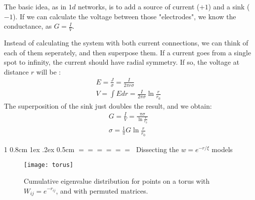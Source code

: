 \documentclass[onecolumn,fleqn,notitlepage,secnumarabic]{revtex4}
\makeatletter
\def\section{%
  \@startsection
    {section}%
    {1}%
    {\z@}%
    {0.8cm \@plus1ex \@minus .2ex}%
    {0.5cm}%
    {\Large\bf $=\!=\!=\!=\!=\!=\;$}%
}%
\makeatother
\begin{document}
The basic idea, as in $1d$ networks, is to add a source of current ($+1$) and a sink ($-1$). If we can calculate the voltage between those "electrodes", we know the conductance, as $G = \frac{I}{V}$. 

Instead of calculating the system with both current connections, we can think of each of them seperately, and then superpose them. If a current goes from a single spot to infinity, the current should have radial symmetry. If so, the voltage at distance $r$ will be :
\begin{align}
  E = \frac{J}{\sigma} = \frac{I}{2\pi r\sigma} \\
  V = \int E dr = \frac{I}{2\pi\sigma}\ln\frac{r}{r_0}
\end{align}
The superposition of the sink just doubles the result, and we obtain:
\begin{align}
    G = \frac{I}{V} = \frac{\pi\sigma }{\ln\frac{r}{r_0}}  \\
    \sigma = \frac{1}{\pi}G\ln\frac{r}{r_0}
\end{align}


\section{Dissecting the $w=e^{-r/\xi}$ models}


\begin{figure}
    \texttt{[image: torus]}
    \caption{Cumulative eigenvalue distribution for points on a torus with $W_{ij} = e^{-r_{ij}}$, and with permuted matrices.}
    \label{fig:distance}
\end{figure}

%

\end{document}
